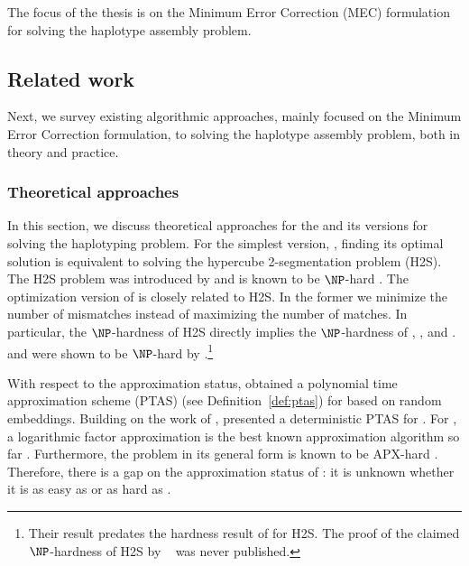 The focus of the thesis is on the Minimum Error Correction (MEC) formulation for solving the haplotype assembly problem.
\subsection{Related work}
Next, we survey existing algorithmic approaches, mainly focused on the Minimum Error Correction formulation, to solving the haplotype assembly problem, both in theory and practice.
\subsubsection{Theoretical approaches}
In this section, we discuss theoretical approaches for the \MEC and its versions for solving the haplotyping problem.
For the simplest version, \BMEC, finding its optimal solution is equivalent to solving the hypercube 2-segmentation problem (H2S).
The H2S problem was introduced by \cite{KPR98_segmentation,KPR04_segmentation} and is known to be $\NP$-hard \citep{Fei14_np,KPR04_segmentation}.
The optimization version of \BMEC  is closely related to H2S. In the former we minimize the number of mismatches instead of maximizing the number of matches.
In particular, the $\NP$-hardness of H2S directly implies the $\NP$-hardness of \BMEC, \GMEC, and \MEC.
\GMEC and \MEC were shown to be $\NP$-hard by \cite{Cilibrasi2007}.\footnote{Their result predates the hardness result of \cite{Fei14_np} for H2S. 
The proof of the claimed $\NP$-hardness of H2S by ~\cite{KPR98_segmentation} was never published.}

With respect to the approximation status, \cite{OR02_polynomial} obtained a polynomial time approximation scheme (PTAS) (see Definition~\ref{def:ptas}) for \BMEC based on random embeddings.
Building on the work of \cite{LMW02_finding}, \cite{JXL04_k} presented a deterministic PTAS for \BMEC.
For \GMEC, a logarithmic factor approximation is the best known approximation algorithm so far \citep{BDK+16_minimum}.
Furthermore, the \MEC problem in its general form is known to be APX-hard \citep{Cilibrasi2007}. 
Therefore, there is a gap on the approximation status of \GMEC: it is unknown whether it is as easy as \BMEC or as hard as \MEC.


